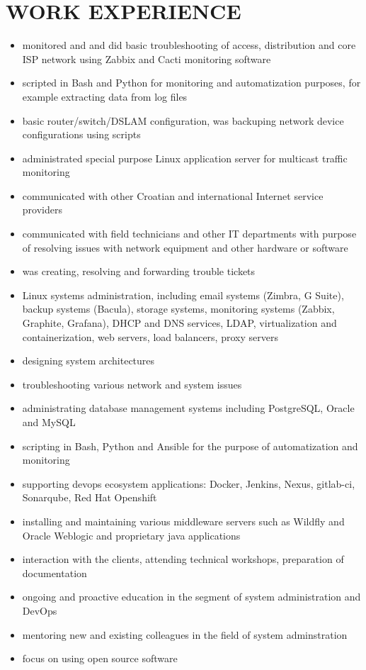 \documentclass{cv}
\begin{document}
\section{WORK EXPERIENCE}
\begin{itemize}
    \setlength\itemsep{0.1cm}
    \item monitored and and did basic troubleshooting of access, distribution and core ISP network using Zabbix and
Cacti monitoring software
    \item scripted in Bash and Python for monitoring and automatization purposes, for example extracting data from log
files
    \item basic router/switch/DSLAM configuration, was backuping network device configurations using scripts
    \item administrated special purpose Linux application server for multicast traffic monitoring
    \item communicated with other Croatian and international Internet service providers
    \item communicated with field technicians and other IT departments with purpose of resolving issues with
network equipment and other hardware or software
    \item was creating, resolving and forwarding trouble tickets
\end{itemize}
\begin{itemize}
    \setlength\itemsep{0.1cm}
    \item Linux systems administration, including email systems (Zimbra, G Suite), backup systems (Bacula), storage systems, monitoring systems (Zabbix, Graphite, Grafana), DHCP and DNS services, LDAP, virtualization and containerization, web servers, load balancers, proxy servers
    \item designing system architectures
    \item troubleshooting various network and system issues 
    \item administrating database management systems including PostgreSQL, Oracle and MySQL
    \item scripting in Bash, Python and Ansible for the purpose of automatization and monitoring
    \item supporting devops ecosystem applications: Docker, Jenkins, Nexus, gitlab-ci, Sonarqube, Red Hat Openshift
    \item installing and maintaining various middleware servers such as Wildfly and Oracle Weblogic and proprietary java applications
    \item interaction with the clients, attending technical workshops, preparation of documentation
    \item ongoing and proactive education in the segment of system administration and DevOps
    \item mentoring new and existing colleagues in the field of system adminstration
    \item focus on using open source software
\end{itemize}
\end{document}
